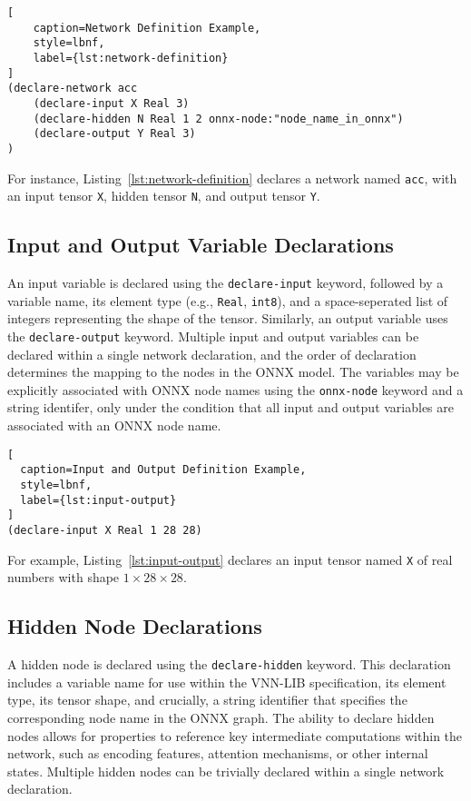 \begin{lstlisting}[
    caption=Network Definition Example, 
    style=lbnf,
    label={lst:network-definition}
]
(declare-network acc
    (declare-input X Real 3)
    (declare-hidden N Real 1 2 onnx-node:"node_name_in_onnx")
    (declare-output Y Real 3)
) 
\end{lstlisting}

For instance, Listing~\ref{lst:network-definition} declares a network named \texttt{acc}, with an input tensor \texttt{X}, hidden tensor \texttt{N}, 
and output tensor \texttt{Y}. 

\subsection{Input and Output Variable Declarations}

An input variable is declared using the \texttt{declare-input} keyword, followed by a variable name, its element type (e.g., \texttt{Real}, \texttt{int8}), 
and a space-seperated list of integers representing the shape of the tensor. Similarly, an output variable uses the \texttt{declare-output} keyword. Multiple 
input and output variables can be declared within a single network declaration, and the order of declaration determines the mapping to the nodes in the ONNX model.
The variables may be explicitly associated with ONNX node names using the \texttt{onnx-node} keyword and a string identifer, only under the condition that all input 
and output variables are associated with an ONNX node name.

\begin{lstlisting}[
  caption=Input and Output Definition Example,
  style=lbnf,
  label={lst:input-output}
]
(declare-input X Real 1 28 28) 
\end{lstlisting}

For example, Listing~\ref{lst:input-output} declares an input tensor named \texttt{X} of real numbers with shape $1 \times 28 \times 28$. 

\subsection{Hidden Node Declarations}

A hidden node is declared using the \texttt{declare-hidden} keyword. This declaration includes a variable name for use within the VNN-LIB specification, 
its element type, its tensor shape, and crucially, a string identifier that specifies the corresponding node name in the ONNX graph. The ability to declare hidden nodes
allows for properties to reference key intermediate computations within the network, such as encoding features, attention mechanisms, or other internal states. Multiple
hidden nodes can be trivially declared within a single network declaration.

